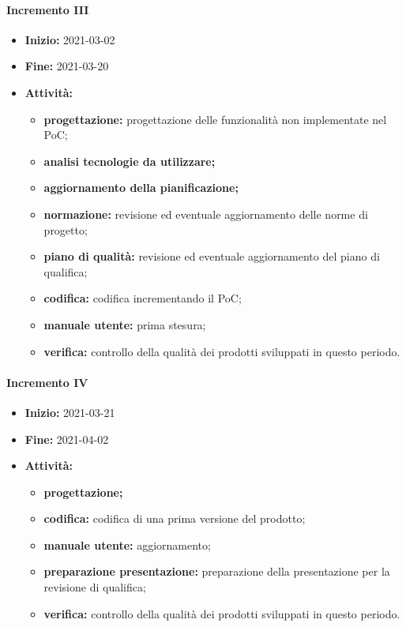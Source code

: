 \paragraph[Incremento III]{Incremento III}
\begin{itemize}
    \item [] \textbf{Inizio:} 2021-03-02
    \item [] \textbf{Fine:} 2021-03-20
    \item [] \textbf{Attività:}
          \begin{itemize}
              \item \textbf{progettazione:} progettazione delle funzionalità non implementate nel PoC;
              \item \textbf{analisi tecnologie da utilizzare;}
              \item \textbf{aggiornamento della pianificazione;}
              \item \textbf{normazione:} revisione ed eventuale aggiornamento delle norme di progetto;
              \item \textbf{piano di qualità:} revisione ed eventuale aggiornamento del piano di qualifica;
              \item \textbf{codifica:} codifica incrementando il PoC;
              \item \textbf{manuale utente:} prima stesura;
              \item \textbf{verifica:} controllo della qualità dei prodotti sviluppati in questo periodo.
          \end{itemize}
\end{itemize}

\paragraph[Incremento IV]{Incremento IV}
\begin{itemize}
    \item [] \textbf{Inizio:} 2021-03-21
    \item [] \textbf{Fine:} 2021-04-02
    \item [] \textbf{Attività:}
          \begin{itemize}
              \item \textbf{progettazione;}
              \item \textbf{codifica:} codifica di una prima versione del prodotto;
              \item \textbf{manuale utente:} aggiornamento;
              \item \textbf{preparazione presentazione:} preparazione della presentazione per la revisione di qualifica;
              \item \textbf{verifica:} controllo della qualità dei prodotti sviluppati in questo periodo.
          \end{itemize}
\end{itemize}

